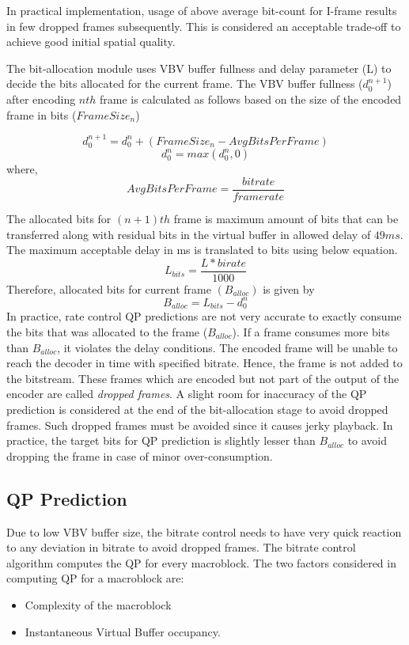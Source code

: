 \documentclass[11pt]{article} %
\begin{document}
In practical implementation, usage of above average bit-count for I-frame results in few dropped frames subsequently. This is considered an acceptable trade-off to achieve good initial spatial quality.

The bit-allocation module uses VBV buffer fullness and delay parameter (L) to decide the bits allocated for the current frame. The VBV buffer fullness ($d_0^{n+1}$) after encoding $nth$ frame is calculated as follows based on the size of the encoded frame in bits ($FrameSize_n$)

$$ d_0^{n+1} = d_0^n + (FrameSize_n - AvgBitsPerFrame)$$
$$ d_0^n = max(d_0^n , 0) $$
where, $$ AvgBitsPerFrame = \frac{bitrate}{framerate}$$

The allocated bits for $(n+1)th$ frame is maximum amount of bits that can be transferred along with residual bits in the virtual buffer in allowed delay of $49ms$. The maximum acceptable delay in ms is translated to bits using below equation.
$$ L_{bits} = \frac{L * birate}{1000}$$
Therefore, allocated bits for current frame $(B_{alloc})$ is given by
$$ B_{alloc} = L_{bits} - d_0^n $$
In practice, rate control QP predictions are not very accurate to exactly consume the bits that was allocated to the frame ($B_{alloc}$). If a frame consumes more bits than $B_{alloc}$, it violates the delay conditions. The encoded frame will be unable to reach the decoder in time with specified bitrate. Hence, the frame is not added to the bitstream. These frames which are encoded but not part of the output of the encoder are called \textit{dropped frames}. A slight room for inaccuracy of the QP prediction is considered at the end of the bit-allocation stage to avoid dropped frames. Such dropped frames must be avoided since it causes jerky playback. In practice, the target bits for QP prediction is slightly lesser than $B_{alloc}$ to avoid dropping the frame in case of minor over-consumption.
\subsection{QP Prediction}  
  Due to low VBV buffer size, the bitrate control needs to have very quick reaction to any deviation in bitrate to avoid dropped frames. The bitrate control algorithm computes the QP for every macroblock. The two factors considered in computing QP for a macroblock are:
  
\begin{itemize}  
\item Complexity of the macroblock
\item Instantaneous Virtual Buffer occupancy.
\end{itemize}
\end{document}
